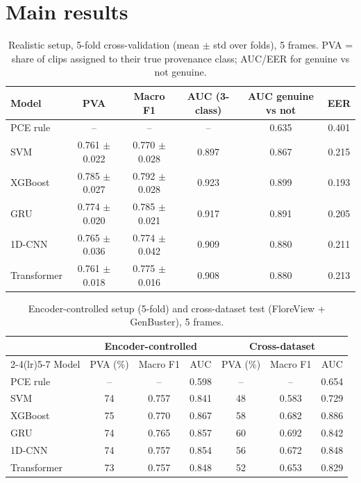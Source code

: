 \documentclass[11pt,a4paper]{article}
\begin{document}
\section{Main results}
\begin{table}[H]\centering\small\caption{Realistic setup, 5-fold cross-validation (mean $\pm$ std over folds), 5 frames. PVA = share of clips assigned to their true provenance class; AUC/EER for genuine vs not genuine.}\label{tab:main}\begin{tabular}{lccccc}\toprule Model & PVA & Macro F1 & AUC (3-class) & AUC genuine vs not & EER \\\midrule
PCE rule & -- & -- & -- & 0.635 & 0.401 \\
SVM & 0.761 $\pm$ 0.022 & 0.770 $\pm$ 0.028 & 0.897 & 0.867 & 0.215 \\
XGBoost & 0.785 $\pm$ 0.027 & 0.792 $\pm$ 0.028 & 0.923 & 0.899 & 0.193 \\
GRU & 0.774 $\pm$ 0.020 & 0.785 $\pm$ 0.021 & 0.917 & 0.891 & 0.205 \\
1D-CNN & 0.765 $\pm$ 0.036 & 0.774 $\pm$ 0.042 & 0.909 & 0.880 & 0.211 \\
Transformer & 0.761 $\pm$ 0.018 & 0.775 $\pm$ 0.016 & 0.908 & 0.880 & 0.213 \\
\bottomrule\end{tabular}\end{table}
\begin{table}[H]\centering\small\caption{Encoder-controlled setup (5-fold) and cross-dataset test (FloreView + GenBuster), 5 frames.}\begin{tabular}{lcccccc}\toprule & \multicolumn{3}{c}{Encoder-controlled} & \multicolumn{3}{c}{Cross-dataset} \\\cmidrule(lr){2-4}\cmidrule(lr){5-7} Model & PVA (\%) & Macro F1 & AUC & PVA (\%) & Macro F1 & AUC \\\midrule
PCE rule & -- & -- & 0.598 & -- & -- & 0.654 \\
SVM & 74 & 0.757 & 0.841 & 48 & 0.583 & 0.729 \\
XGBoost & 75 & 0.770 & 0.867 & 58 & 0.682 & 0.886 \\
GRU & 74 & 0.765 & 0.857 & 60 & 0.692 & 0.842 \\
1D-CNN & 74 & 0.757 & 0.854 & 56 & 0.672 & 0.848 \\
Transformer & 73 & 0.757 & 0.848 & 52 & 0.653 & 0.829 \\
\bottomrule\end{tabular}\end{table}
\end{document}
